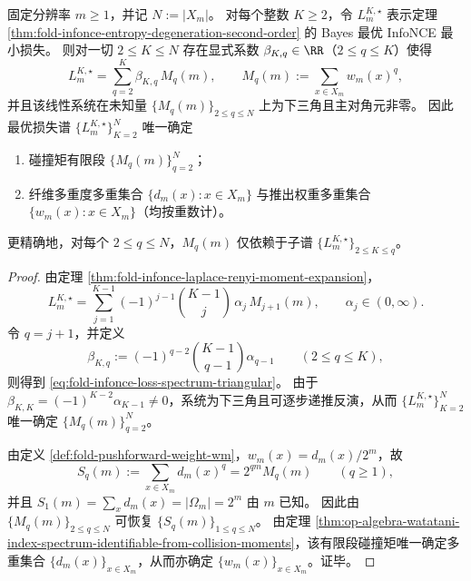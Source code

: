\begin{theorem}\label{thm:fold-infonce-loss-spectrum-identifiability}
固定分辨率 \(m\ge 1\)，并记 \(N:=|X_m|\)。
对每个整数 \(K\ge 2\)，令 \(L_m^{K,\star}\) 表示定理 \ref{thm:fold-infonce-entropy-degeneration-second-order} 的 Bayes 最优 InfoNCE 最小损失。
则对一切 \(2\le K\le N\) 存在显式系数 \(\beta_{K,q}\in\RR\)（\(2\le q\le K\)）使得
\begin{equation}\label{eq:fold-infonce-loss-spectrum-triangular}
L_m^{K,\star}=\sum_{q=2}^{K}\beta_{K,q}\,M_q(m),
\qquad
M_q(m):=\sum_{x\in X_m} w_m(x)^q,
\end{equation}
并且该线性系统在未知量 \(\{M_q(m)\}_{2\le q\le N}\) 上为下三角且主对角元非零。
因此最优损失谱 \(\{L_m^{K,\star}\}_{K=2}^{N}\) 唯一确定
\begin{enumerate}
\normalfont
  \item 碰撞矩有限段 \(\{M_q(m)\}_{q=2}^{N}\)；
  \item 纤维多重度多重集合 \(\{d_m(x):x\in X_m\}\) 与推出权重多重集合 \(\{w_m(x):x\in X_m\}\)（均按重数计）。
\end{enumerate}
更精确地，对每个 \(2\le q\le N\)，\(M_q(m)\) 仅依赖于子谱 \(\{L_m^{K,\star}\}_{2\le K\le q}\)。
\end{theorem}
\begin{proof}
由定理 \ref{thm:fold-infonce-laplace-renyi-moment-expansion}，
\[
L_m^{K,\star}
=
\sum_{j=1}^{K-1}(-1)^{j-1}\binom{K-1}{j}\,\alpha_j\,M_{j+1}(m),
\qquad
\alpha_j\in(0,\infty).
\]
令 \(q=j+1\)，并定义
\[
\beta_{K,q}:=(-1)^{q-2}\binom{K-1}{q-1}\alpha_{q-1}\qquad(2\le q\le K),
\]
则得到 \eqref{eq:fold-infonce-loss-spectrum-triangular}。
由于 \(\beta_{K,K}=(-1)^{K-2}\alpha_{K-1}\neq 0\)，系统为下三角且可逐步递推反演，从而 \(\{L_m^{K,\star}\}_{K=2}^{N}\) 唯一确定 \(\{M_q(m)\}_{q=2}^{N}\)。
\par
由定义 \ref{def:fold-pushforward-weight-wm}，\(w_m(x)=d_m(x)/2^m\)，故
\[
S_q(m):=\sum_{x\in X_m}d_m(x)^q=2^{qm}M_q(m)\qquad(q\ge 1),
\]
并且 \(S_1(m)=\sum_x d_m(x)=|\Omega_m|=2^m\) 由 \(m\) 已知。
因此由 \(\{M_q(m)\}_{2\le q\le N}\) 可恢复 \(\{S_q(m)\}_{1\le q\le N}\)。
由定理 \ref{thm:op-algebra-watatani-index-spectrum-identifiable-from-collision-moments}，该有限段碰撞矩唯一确定多重集合 \(\{d_m(x)\}_{x\in X_m}\)，从而亦确定 \(\{w_m(x)\}_{x\in X_m}\)。证毕。
\end{proof}

